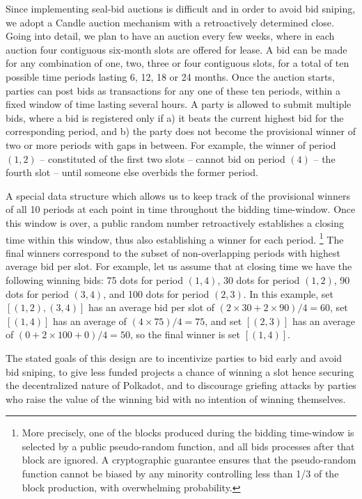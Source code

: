 Since implementing seal-bid auctions is difficult and in order to avoid bid sniping, we adopt a Candle auction \cite{Fuellbrunn:2012:CandleAuction} mechanism with a retroactively determined close. 
Going into detail, we plan to have an auction every few weeks, where in each auction four contiguous six-month slots are offered for lease. A bid can be made for any combination of one, two, three or four contiguous slots, for a total of ten possible time periods lasting 6, 12, 18 or 24 months. Once the auction starts, parties can post bids as transactions for any one of these ten periods, within a fixed window of time lasting several hours. A party is allowed to submit multiple bids, where a bid is registered only if a) it beats the current highest bid for the corresponding period, and b) the party does not become the provisional winner of two or more periods with gaps in between. For example, the winner of period $(1,2)$ -- constituted of the first two slots -- cannot bid on period $(4)$ -- the fourth slot -- until someone else overbids the former period. 

A special data structure which allows us to keep track of the provisional winners of all 10 periods at each point in time throughout the bidding time-window. Once this window is over, a public random number retroactively establishes a closing time within this window, thus also establishing a winner for each period.%
\footnote{More precisely, one of the blocks produced during the bidding time-window is selected by a public pseudo-random function, and all bids processes after that block are ignored. A cryptographic guarantee ensures that the pseudo-random function cannot be biased by any minority controlling less than 1/3 of the block production, with overwhelming probability.} %
The final winners correspond to the subset of non-overlapping periods with highest average bid per slot. For example, let us assume that at closing time we have the following winning bids: 75 dots for period $(1,4)$, 30 dots for period $(1,2)$, 90 dots for period $(3,4)$, and 100 dots for period $(2,3)$. In this example, set $[(1,2), (3,4)]$ has an average bid per slot of $(2\times 30 + 2\times 90)/4 = 60$, set $[(1,4)]$ has an average of $(4\times 75)/4 = 75$, and set $[(2,3)]$ has an average of $(0+2\times 100+0)/4=50$, so the final winner is set $[(1,4)]$. 

The stated goals of this design are to incentivize parties to bid early and avoid bid sniping, to give less funded projects a chance of winning a slot hence securing the decentralized nature of Polkadot, and to discourage griefing attacks by parties who raise the value of the winning bid with no intention of winning themselves.

